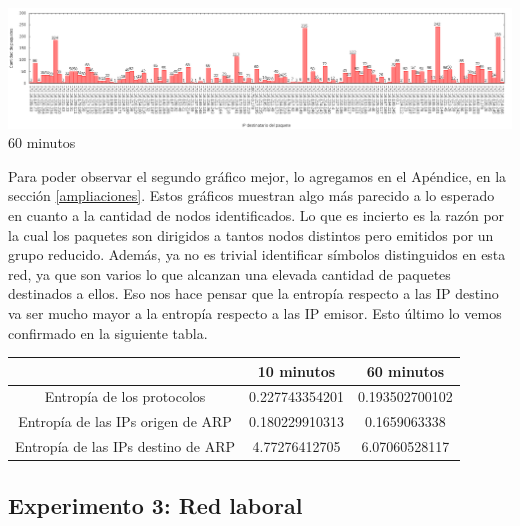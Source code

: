 \begin{center}
\includegraphics[width=16cm]{../mediciones/altop-wifi-60/altop60IpsDstArp.png}
60 minutos
\end{center}

Para poder observar el segundo gráfico mejor, lo agregamos en el Apéndice, en la sección \ref{ampliaciones}.
Estos gráficos muestran algo más parecido a lo esperado en cuanto a la cantidad de nodos identificados.
Lo que es incierto es la razón por la cual
los paquetes son dirigidos a tantos nodos distintos pero emitidos por un grupo reducido. Además, ya no es trivial identificar
símbolos distinguidos en esta red, ya que son varios lo que alcanzan una elevada cantidad de paquetes destinados a ellos.
Eso nos hace pensar que la entropía respecto a las IP destino va ser mucho mayor a la entropía
respecto a las IP emisor. Esto último lo vemos confirmado en la siguiente tabla.

\begin{center}
\begin{tabular}{|c||c|c|}
\hline
 & 10 minutos & 60 minutos \\
\hline
\hline
Entropía de los protocolos & 0.227743354201 & 0.193502700102 \\
\hline
Entropía de las IPs origen de ARP & 0.180229910313 & 0.1659063338 \\
\hline
Entropía de las IPs destino de ARP & 4.77276412705 & 6.07060528117 \\
\hline
\end{tabular}
\end{center}

\subsection{Experimento 3: Red laboral}

